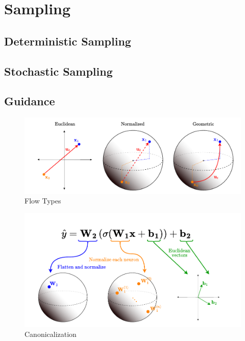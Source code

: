 \section{Sampling}

\subsection{Deterministic Sampling}

\subsection{Stochastic Sampling }

\subsection{Guidance}

\begin{figure}[h!]
    \centering
    \includegraphics[width=\textwidth]{figures/flow_types.drawio.pdf}
    \caption{\label{fig:flow_types} Flow Types}
\end{figure}

\begin{figure}[h!]
    \centering
    \includegraphics[width=\textwidth]{figures/canonicalization.drawio.pdf}
    \caption{\label{fig:canonicalization} Canonicalization}
\end{figure}